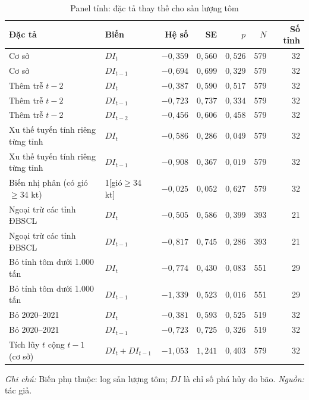 \documentclass[12pt,a4paper]{article}
\begin{document}
\begin{table}[!tbp]
\centering\scriptsize
\caption{Panel tỉnh: đặc tả thay thế cho sản lượng tôm}
\label{tab:rA}
\begin{tabular}{@{}llrrrrr@{}}
\toprule
Đặc tả & Biến & Hệ số & SE & $p$ & $N$ & Số tỉnh\\
\midrule
Cơ sở & $DI_t$ & $-0{,}359$ & $0{,}560$ & $0{,}526$ & 579 & 32 \\
Cơ sở & $DI_{t-1}$ & $-0{,}694$ & $0{,}699$ & $0{,}329$ & 579 & 32 \\
Thêm trễ $t-2$ & $DI_t$ & $-0{,}387$ & $0{,}590$ & $0{,}517$ & 579 & 32 \\
Thêm trễ $t-2$ & $DI_{t-1}$ & $-0{,}723$ & $0{,}737$ & $0{,}334$ & 579 & 32 \\
Thêm trễ $t-2$ & $DI_{t-2}$ & $-0{,}456$ & $0{,}606$ & $0{,}458$ & 579 & 32 \\
Xu thế tuyến tính riêng từng tỉnh & $DI_t$ & $-0{,}586$ & $0{,}286$ & $0{,}049$ & 579 & 32 \\
Xu thế tuyến tính riêng từng tỉnh & $DI_{t-1}$ & $-0{,}908$ & $0{,}367$ & $0{,}019$ & 579 & 32 \\
Biến nhị phân (có gió $\geq$34 kt) & 1[gió$\geq$34 kt] & $-0{,}025$ & $0{,}052$ & $0{,}627$ & 579 & 32 \\
Ngoại trừ các tỉnh ĐBSCL & $DI_t$ & $-0{,}505$ & $0{,}586$ & $0{,}399$ & 393 & 21 \\
Ngoại trừ các tỉnh ĐBSCL & $DI_{t-1}$ & $-0{,}817$ & $0{,}745$ & $0{,}286$ & 393 & 21 \\
Bỏ tỉnh tôm dưới 1.000 tấn & $DI_t$ & $-0{,}774$ & $0{,}430$ & $0{,}083$ & 551 & 29 \\
Bỏ tỉnh tôm dưới 1.000 tấn & $DI_{t-1}$ & $-1{,}339$ & $0{,}523$ & $0{,}016$ & 551 & 29 \\
Bỏ 2020--2021 & $DI_t$ & $-0{,}381$ & $0{,}593$ & $0{,}525$ & 519 & 32 \\
Bỏ 2020--2021 & $DI_{t-1}$ & $-0{,}723$ & $0{,}725$ & $0{,}326$ & 519 & 32 \\
Tích lũy $t$ cộng $t-1$ (cơ sở) & $DI_t+DI_{t-1}$ & $-1{,}053$ & $1{,}241$ & $0{,}403$ & 579 & 32 \\
\bottomrule
\end{tabular}
\begin{minipage}{\textwidth}\footnotesize
\textit{Ghi chú:} Biến phụ thuộc: log sản lượng tôm; $DI$ là chỉ số phá hủy do bão. \textit{Nguồn:} tác giả.
\end{minipage}
\end{table}
\end{document}
